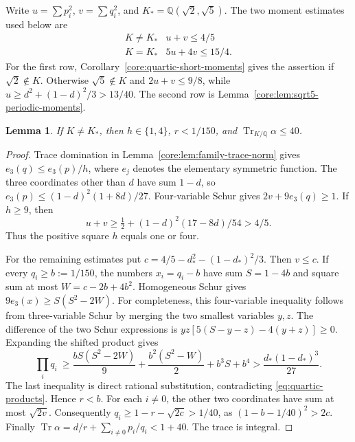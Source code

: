 \documentclass[11pt,a4paper]{article}
\newtheorem{lemma}[theorem]{Lemma}
\theoremstyle{definition}\newtheorem{definition}[theorem]{Definition}
\theoremstyle{remark}\newtheorem{remark}[theorem]{Remark}
\DeclareMathOperator{\Tr}{Tr}
\newcommand{\Q}{\mathbb Q}
\numberwithin{equation}{section}
\begin{document}
Write $u=\sum p_i^2$, $v=\sum q_i^2$, and
$K_*=\Q(\sqrt2,\sqrt5)$. The two moment estimates used below are
\begin{equation}\label{eq:quartic-budgets}
 \begin{array}{c|c}
 K\ne K_*&u+v\le4/5\\
 K=K_*&5u+4v\le15/4 .
 \end{array}
\end{equation}
For the first row, Corollary~\ref{core:quartic-short-moments} gives
the assertion if $\sqrt2\notin K$. Otherwise $\sqrt5\notin K$ and
$2u+v\le9/8$, while $u\ge d^2+(1-d)^2/3>13/40$.
The second row is Lemma~\ref{core:lem:sqrt5-periodic-moments}.

\begin{lemma}\label{quart:outside-trace}
If $K\ne K_*$, then $h\in\{1,4\}$, $r<1/150$, and
$\Tr_{K/\Q}\alpha\le40$.
\end{lemma}
\begin{proof}
Trace domination in Lemma~\ref{core:lem:family-trace-norm} gives
$e_3(q)\le e_3(p)/h$, where $e_j$ denotes the elementary symmetric
function. The three coordinates other than $d$ have sum $1-d$, so
$e_3(p)\le (1-d)^2(1+8d)/27$. Four-variable Schur gives
$2v+9e_3(q)\ge1$. If $h\ge9$, then
\[
 u+v\ge\tfrac12+(1-d)^2(17-8d)/54>4/5.
\]
Thus the positive square $h$ equals one or four.

For the remaining estimates put
$c=4/5-d_*^2-(1-d_*)^2/3$. Then $v\le c$.
If every $q_i\ge b:=1/150$, the numbers $x_i=q_i-b$ have sum
$S=1-4b$ and square sum at most $W=c-2b+4b^2$. Homogeneous Schur
gives $9e_3(x)\ge S(S^2-2W)$. For completeness, this four-variable
inequality follows from three-variable Schur by merging the two
smallest variables $y,z$. The difference of the two Schur expressions
is $yz[5(S-y-z)-4(y+z)]\ge0$. Expanding the shifted product gives
\[
 \prod_i q_i\ \ge \frac{bS(S^2-2W)}9+\frac{b^2(S^2-W)}2+b^3S+b^4
 >\frac{d_*(1-d_*)^3}{27}.
\]
The last inequality is direct rational substitution, contradicting
\eqref{eq:quartic-products}. Hence $r<b$. For each $i\ne0$, the other
two coordinates have sum at most $\sqrt{2v}$. Consequently
$q_i\ge1-r-\sqrt{2c}>1/40$, as
$(1-b-1/40)^2>2c$. Finally
$\Tr\alpha= d/r+\sum_{i\ne0}p_i/q_i<1+40$. The trace is integral.
\end{proof}
\end{document}
